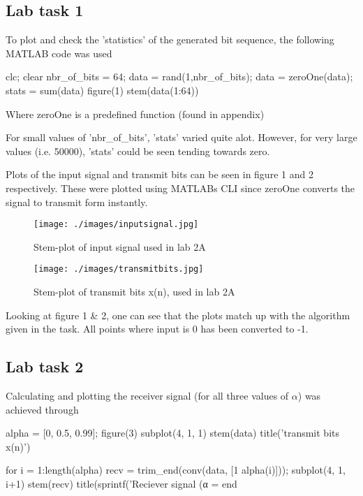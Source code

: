 \documentclass[a4paper,11pt]{article}
\begin{document}
\subsection{Lab task 1}
To plot and check the 'statistics' of the generated bit sequence, the following MATLAB code was used
\begin{ffcode}
clc; clear
nbr_of_bits = 64;
data = rand(1,nbr_of_bits);
data = zeroOne(data);
stats = sum(data)
figure(1)
stem(data(1:64))
\end{ffcode}
Where zeroOne is a predefined function (found in appendix)

For small values of 'nbr\_of\_bits', 'stats' varied quite alot. However, for very large values (i.e. 50000), 'stats' could be seen tending towards zero.


Plots of the input signal and transmit bits can be seen in figure 1 and 2 respectively. These were plotted using MATLABs CLI since zeroOne converts the signal to transmit form instantly.

\begin{figure}[H]
    \hspace{-40pt}\texttt{[image: ./images/inputsignal.jpg]}
    \caption{Stem-plot of input signal used in lab 2A}
    \label{fig:my_label}
\end{figure}

\begin{figure}[H]
    \hspace{-40pt}\texttt{[image: ./images/transmitbits.jpg]}
    \caption{Stem-plot of transmit bits x(n), used in lab 2A}
    \label{fig:my_label}
\end{figure}

Looking at figure 1 & 2, one can see that the plots match up with the algorithm given in the task. All points where input is 0 has been converted to -1.

\subsection{Lab task 2}
Calculating and plotting the receiver signal (for all three values of $\alpha$) was achieved through
\begin{ffcode}
alpha = [0, 0.5, 0.99];
figure(3)
subplot(4, 1, 1)
stem(data)
title('transmit bits x(n)')

for i = 1:length(alpha)
recv = trim_end(conv(data, [1 alpha(i)]));
subplot(4, 1, i+1)
stem(recv)
title(sprintf('Reciever signal (α = %
end
\end{ffcode}
\end{document}
